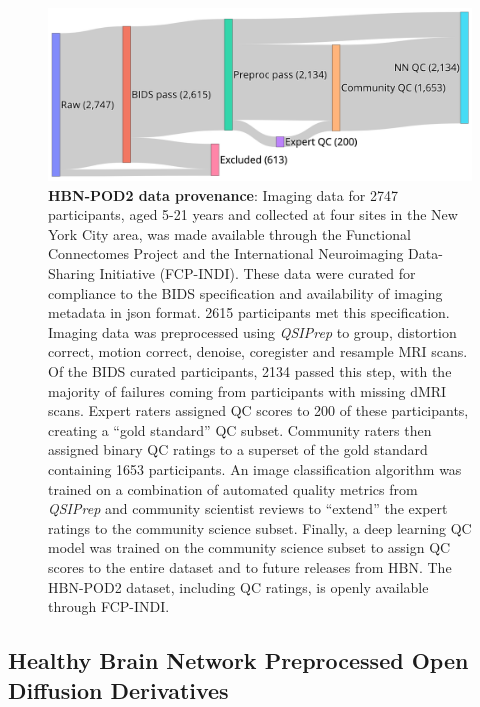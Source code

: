 \documentclass[fleqn,10pt,inline]{wlscirep}
\begin{document}
\begin{figure}[tbp]
    \centering
    \includegraphics[width=0.75\linewidth]{hbn-pod2-sankey.png}
    \caption{%
        {\bf HBN-POD2 data provenance}:
        Imaging data for \num{2747} participants, aged 5-21 years and collected at four
        sites in the New York City area, was made available through the
        Functional Connectomes Project and the International Neuroimaging
        Data-Sharing Initiative (FCP-INDI).
        These data were curated for compliance to the BIDS specification
        \cite{gorgolewski2016-lh} and availability of imaging metadata in json
        format. \num{2615} participants met this specification.
        Imaging data was preprocessed using \emph{QSIPrep} \cite{cieslak2021-iq}
        to group, distortion correct, motion correct, denoise, coregister and
        resample MRI scans. Of the BIDS curated participants, \num{2134}
        passed this step, with the majority of failures coming from participants
        with missing dMRI scans.
        Expert raters assigned QC scores to \num{200} of these participants,
        creating a ``gold standard'' QC subset. Community raters then assigned
        binary QC ratings to a superset of the gold standard containing
        \num{1653} participants. An image classification algorithm was trained
        on a combination of automated quality metrics from \emph{QSIPrep} and community
        scientist reviews to ``extend'' the expert ratings to the community
        science subset. Finally, a deep learning QC model was trained on the
        community science subset to assign QC scores to the entire dataset and
        to future releases from HBN.
        The HBN-POD2 dataset, including QC ratings, is openly available through
        FCP-INDI.
    }
    \label{fig:hbn-sankey}
\end{figure}

\subsection*{Healthy Brain Network Preprocessed Open Diffusion Derivatives}
\end{document}
